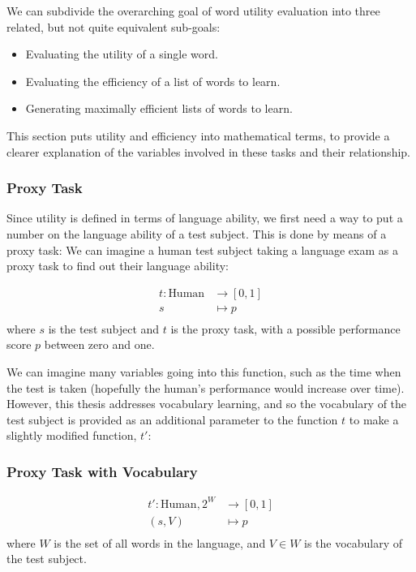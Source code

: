 We can subdivide the overarching goal of word utility evaluation into three related, but not quite equivalent sub-goals:
\begin{itemize}
	\item Evaluating the utility of a single word.
	\item Evaluating the efficiency of a list of words to learn.
	\item Generating maximally efficient lists of words to learn.
\end{itemize}

This section puts utility and efficiency into mathematical terms, to provide a clearer explanation of the variables involved in these tasks and their relationship.

\subsubsection{Proxy Task}
Since utility is defined in terms of language ability, we first need a way to put a number on the language ability of a test subject. This is done by means of a proxy task: We can imagine a human test subject taking a language exam as a proxy task to find out their language ability:

\begin{align*}
	t: \text{Human} & \to [0, 1] \\
	s & \mapsto p            \\
\end{align*}
where $s$ is the test subject and $t$ is the proxy task, with a possible performance score $p$ between zero and one.

We can imagine many variables going into this function, such as the time when the test is taken (hopefully the human's performance would increase over time). However, this thesis addresses vocabulary learning, and so the vocabulary of the test subject is provided as an additional parameter to the function $t$ to make a slightly modified function, $t'$:

\subsubsection{Proxy Task with Vocabulary}
\begin{align*}
	t': \text{Human}, 2^{W} & \to [0, 1] \\
	(s, V) & \mapsto p               \\
\end{align*}
where $W$ is the set of all words in the language, and $V \in W$ is the vocabulary of the test subject.

